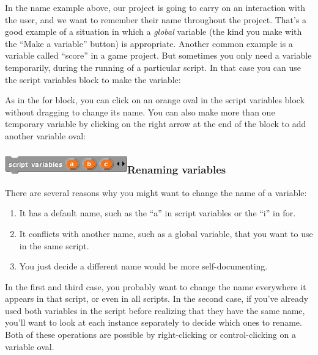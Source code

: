 In the name example above, our project is going to carry on an
interaction with the user, and we want to remember their name throughout
the project. That's a good example of a situation in which a
\emph{global} variable (the kind you make with the ``Make a variable''
button) is appropriate. Another common example is a variable called
``score'' in a game project. But sometimes you only need a variable
temporarily, during the running of a particular script. In that case you
can use the script variables block to make the variable:

As in the for block, you can click on an orange oval in the script
variables block without dragging to change its name. You can also make
more than one temporary variable by clicking on the right arrow at the
end of the block to add another variable oval:

\subsubsection[Renaming
variables]{\texorpdfstring{\protect\includegraphics[width=2.08333in,height=0.30208in]{media/image106.png}Renaming
variables}{Renaming variables}}\label{renaming-variables}

There are several reasons why you might want to change the name of a
variable:

\begin{enumerate}
\def\labelenumi{\arabic{enumi}.}
\item
  It has a default name, such as the ``a'' in script variables or the
  ``i'' in for.
\item
  It conflicts with another name, such as a global variable, that you
  want to use in the same script.
\item
  You just decide a different name would be more self-documenting.
\end{enumerate}

In the first and third case, you probably want to change the name
everywhere it appears in that script, or even in all scripts. In the
second case, if you've already used both variables in the script before
realizing that they have the same name, you'll want to look at each
instance separately to decide which ones to rename. Both of these
operations are possible by right-clicking or control-clicking on a
variable oval.

